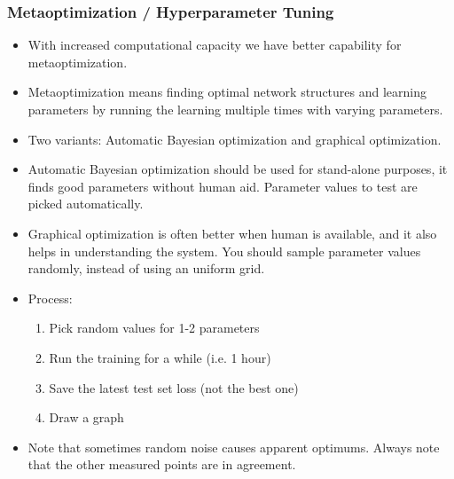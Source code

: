 \documentclass[8pt]{beamer}
\begin{document}
\begin{frame}
\frametitle{Metaoptimization / Hyperparameter Tuning}
 \begin{itemize}
 \item With increased computational capacity we have better capability for metaoptimization.
 \item Metaoptimization means finding optimal network structures and learning parameters by running the learning multiple times with varying parameters.
 \item Two variants: Automatic Bayesian optimization and graphical optimization.
 \item Automatic Bayesian optimization should be used for stand-alone purposes, it finds good parameters without human aid.
       Parameter values to test are picked automatically.
 \item Graphical optimization is often better when human is available, and it also helps in understanding the system. You should sample
       parameter values randomly, instead of using an uniform grid.
 \item Process:
\begin{enumerate}
 \item Pick random values for 1-2 parameters
 \item Run the training for a while (i.e. 1 hour)
 \item Save the latest test set loss (not the best one)
 \item Draw a graph
\end{enumerate}
 \item Note that sometimes random noise causes apparent optimums. Always note that the other measured points are in agreement.
 \end{itemize}
\end{frame}
\end{document}
